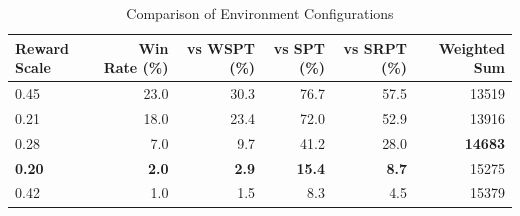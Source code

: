 \begin{table}[htbp]%
\centering%
\begin{tabular}{lrrrrr}%
\toprule%
\textbf{Reward Scale}&\textbf{Win Rate (\%)}&\textbf{vs WSPT (\%)}&\textbf{vs SPT (\%)}&\textbf{vs SRPT (\%)}&\textbf{Weighted Sum}\\%
\midrule%
0.45&23.0&30.3&76.7&57.5&13519\\%
0.21&18.0&23.4&72.0&52.9&13916\\%
0.28&7.0&9.7&41.2&28.0&\textbf{14683}\\%
\textbf{0.20}&\textbf{2.0}&\textbf{2.9}&\textbf{15.4}&\textbf{8.7}&15275\\%
0.42&1.0&1.5&8.3&4.5&15379\\%
\bottomrule%
\end{tabular}%
\caption{Comparison of Environment Configurations}%
\label{tab:environment}%
\end{table}
